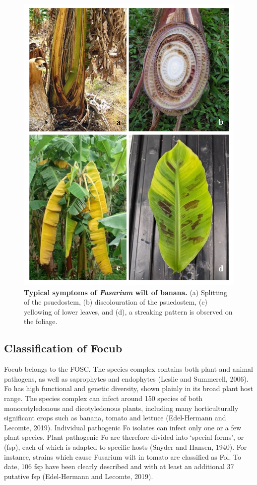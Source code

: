 \begin{figure}[hpt!]
    \centering
    \includegraphics[width=15cm]{Figures/SymptomsofFoc.pdf}
    \caption[Typical symptoms of Fusarium  wilt of banana.]{\textbf{Typical symptoms of \textit{Fusarium} wilt of banana.} (a) Splitting of the psuedostem, (b) discolouration of the psuedostem, (c) yellowing of lower leaves, and (d), a streaking pattern is observed on the foliage.}
    \label{fig:FusariumWiltSymptoms}
\end{figure}

\subsection{Classification of \acl{Focub}}

\ac{Focub} belongs to the \ac{FOSC}. The species complex contains both plant and animal pathogens, as well as saprophytes and endophytes (Leslie and Summerell, 2006). \ac{Fo} has high functional and genetic diversity, shown plainly in its broad plant host range. The species complex can infect around 150 species of both monocotyledonous and dicotyledonous plants, including many horticulturally significant crops such as banana, tomato and lettuce  (Edel-Hermann and Lecomte, 2019).  Individual pathogenic \ac{Fo} isolates can infect only one or a few plant species. Plant pathogenic \ac{Fo} are therefore divided into ‘special forms’, or (\ac{fsp}), each of which is adapted to specific hosts (Snyder and Hansen, 1940). For instance, strains which cause Fusarium wilt in tomato are classified as \ac{Fol}. To date, 106 \ac{fsp} have been clearly described and with at least an additional 37 putative \ac{fsp} (Edel-Hermann and Lecomte, 2019).   

